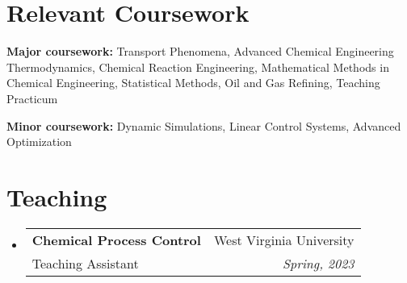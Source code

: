 \documentclass[letterpaper,11pt]{article}
\makeatletter
\newcommand{\resumeTeachingHeading}[4]{
	 \vspace{-2pt}\item
	\begin{tabular*}{0.97\textwidth}[t]{l@{\extracolsep{\fill}}r}
		\textbf{#1} & #2 \\
		{#3} & \textit{\small #4} \\
	\end{tabular*}\vspace{-7pt}
}
\newcommand{\resumeOrganizationHeading}[4]{
  \vspace{-2pt}\item
    \begin{tabular*}{0.97\textwidth}[t]{l@{\extracolsep{\fill}}r}
      \textbf{#1} & \textit{\small #2} \\
      \textit{\small#3}
    \end{tabular*}\vspace{-7pt}
}
\newcommand{\resumeSubHeadingListStart}{\begin{itemize}[leftmargin=0.15in, label={}]}
\newcommand{\resumeSubHeadingListEnd}{\end{itemize}}
\makeatother
\begin{document}
\setlength{\bibhang}{3pt}
{\list
	{}
	{\setlength{\leftmargin}{\bibhang}%
		\setlength{\itemindent}{-\leftmargin}%
		\setlength{\itemsep}{\bibitemsep}%
		\setlength{\parsep}{\bibparsep}}}
{\endlist}
{\item}
\nocite{*}
\printbibliography[env = bibliography, title= Selected Research Publications]


\section{Relevant Coursework}
  \vspace{2pt}
  \resumeSubHeadingListStart
    \small{\item{
        \textbf{Major coursework:}{ Transport Phenomena, Advanced Chemical Engineering Thermodynamics, Chemical Reaction Engineering, Mathematical Methods in Chemical Engineering, Statistical Methods, Oil and Gas Refining, Teaching Practicum} \\ \vspace{3pt}
        
        \textbf{Minor coursework:}{ Dynamic Simulations, Linear Control Systems, Advanced Optimization}
    }}
  \resumeSubHeadingListEnd


  \section{Teaching}
  \vspace{3pt}
  \resumeSubHeadingListStart
  \resumeTeachingHeading{Chemical Process Control}{West Virginia University}{Teaching Assistant}{Spring, 2023}
  
\resumeSubHeadingListEnd


    
    



\end{document}
